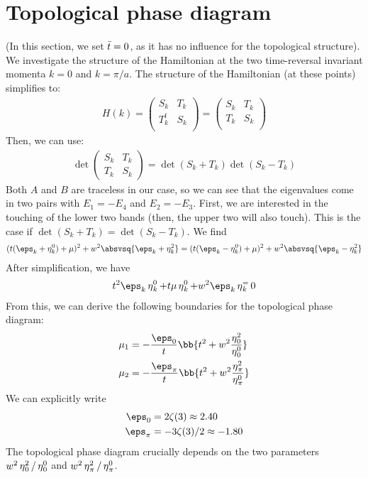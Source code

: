 \section{Topological phase diagram}
(In this section, we set $\bar{t}=0$, as it has no influence for the topological structure).
We investigate the structure of the Hamiltonian at the two time-reversal invariant momenta $k=0$ and $k=\pi/a$.
The structure of the Hamiltonian (at these points) simplifies to:
\begin{align}
    H(k) =
    \begin{pmatrix}
        S_k & T_k \\
        T_k^t & S_k \\
    \end{pmatrix}
    =
    \begin{pmatrix}
        S_k & T_k \\
        T_k & S_k \\
    \end{pmatrix}
\end{align}
Then, we can use:
\begin{align}
    \det
    \begin{pmatrix}
        S_k & T_k \\
        T_k & S_k
    \end{pmatrix}
    = \det (S_k+T_k) \det (S_k-T_k)
\end{align}
Both $A$ and $B$ are traceless in our case, so we can see that the eigenvalues come in two pairs with $E_1 = -E_4$ and $E_2 = -E_3$. First, we are interested in the touching of the lower two bands (then, the upper two will also touch).
This is the case if $\det (S_k+T_k) = \det (S_k-T_k)$. We find
\begin{align}
    (t(\eps_k+\eta_k^0)+\mu)^2 + w^2 \absvsq{\eps_k+\eta^{2}_k} = (t(\eps_k-\eta_k^0)+\mu)^2 + w^2 \absvsq{\eps_k-\eta^{2}_k}
\end{align}
After simplification, we have
\begin{align}
    t^2\eps_k\et_k^0+t\mu \et_k^0 + w^2 \eps_k \et_k^ = 0
\end{align}
From this, we can derive the following boundaries for the topological phase diagram:
\begin{align}
    \mu_1 &= -\frac{\eps_0}{t}\bb{t^2+w^2 \frac{\et_0^2}{\et_0^0}} \\
    \mu_2 &= -\frac{\eps_\pi}{t}\bb{t^2+w^2 \frac{\et_\pi^2}{\et_\pi^0}}
\end{align}
We can explicitly write
\begin{align}
    \eps_0 &= 2\zeta(3) \approx 2.40 \\
    \eps_\pi &= -3 \zeta(3) / 2 \approx -1.80
\end{align}
The topological phase diagram crucially depends on the two parameters $w^2 \operatorname{\eta}^2_0/\operatorname{\eta}^0_0$ and $w^2 \operatorname{\eta}^2_\pi/\operatorname{\eta}^0_\pi$.

